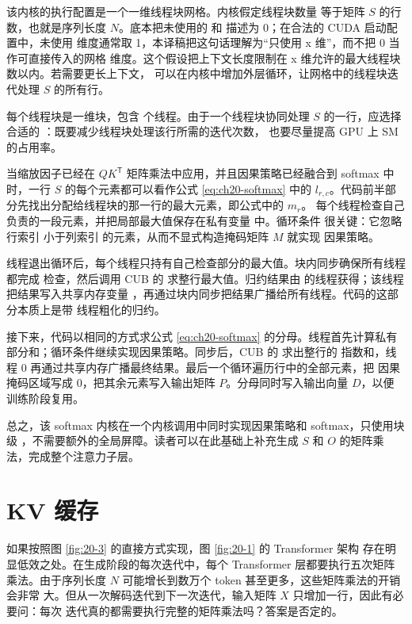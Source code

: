 该内核的执行配置是一个一维线程块网格。内核假定线程块数量
 等于矩阵 $S$ 的行数，也就是序列长度 $N$。底本把未使用的
 和  描述为 0；在合法的 CUDA 启动配置中，未使用
维度通常取 1，本译稿把这句话理解为“只使用 x 维”，而不把 0 当作可直接传入的网格
维度。这个假设把上下文长度限制在 x 维允许的最大线程块数以内。若需要更长上下文，
可以在内核中增加外层循环，让网格中的线程块迭代处理 $S$ 的所有行。

每个线程块是一维块，包含  个线程。由于一个线程块协同处理 $S$
的一行，应选择合适的 ：既要减少线程块处理该行所需的迭代次数，
也要尽量提高 GPU 上 SM 的占用率。

当缩放因子已经在 $QK^{\mathsf T}$ 矩阵乘法中应用，并且因果策略已经融合到 softmax
中时，一行 $S$ 的每个元素都可以看作公式 \eqref{eq:ch20-softmax} 中的
$l_{r,c}$。代码前半部分先找出分配给线程块的那一行的最大元素，即公式中的 $m_r$。
每个线程检查自己负责的一段元素，并把局部最大值保存在私有变量
 中。循环条件  很关键：它忽略行索引
 小于列索引  的元素，从而不显式构造掩码矩阵 $M$ 就实现
因果策略。

线程退出循环后，每个线程只持有自己检查部分的最大值。块内同步确保所有线程都完成
检查，然后调用 CUB 的  求整行最大值。归约结果由
 的线程获得；该线程把结果写入共享内存变量
，再通过块内同步把结果广播给所有线程。代码的这部分本质上是带
线程粗化的归约。

接下来，代码以相同的方式求公式 \eqref{eq:ch20-softmax} 的分母。线程首先计算私有
部分和；循环条件继续实现因果策略。同步后，CUB 的  求出整行的
指数和，线程 0 再通过共享内存广播最终结果。最后一个循环遍历行中的全部元素，把
因果掩码区域写成 0，把其余元素写入输出矩阵 $P$。分母同时写入输出向量 $D$，以便
训练阶段复用。

总之，该 softmax 内核在一个内核调用中同时实现因果策略和 softmax，只使用块级
，不需要额外的全局屏障。读者可以在此基础上补充生成 $S$
和 $O$ 的矩阵乘法，完成整个注意力子层。

\section{KV 缓存}
\label{sec:ch20-kv-cache}

如果按照图 \ref{fig:20-3} 的直接方式实现，图 \ref{fig:20-1} 的 Transformer 架构
存在明显低效之处。在生成阶段的每次迭代中，每个 Transformer 层都要执行五次矩阵
乘法。由于序列长度 $N$ 可能增长到数万个 token 甚至更多，这些矩阵乘法的开销会非常
大。但从一次解码迭代到下一次迭代，输入矩阵 $X$ 只增加一行，因此有必要问：每次
迭代真的都需要执行完整的矩阵乘法吗？答案是否定的。

